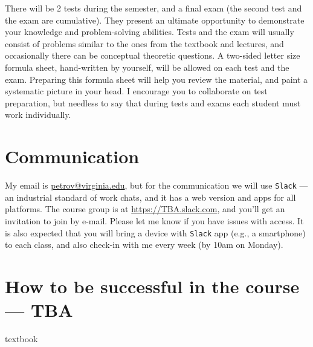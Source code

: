 \documentclass[oneside,11pt]{amsart}
\begin{document}
There will be 2 tests during the semester, and a final exam (the second test and the exam are cumulative). 
They present an ultimate opportunity to demonstrate your knowledge and
problem-solving abilities. Tests and the exam will usually consist of problems similar to the 
ones from the textbook and lectures, and occasionally 
there can be conceptual theoretic questions.
A two-sided letter size 
formula sheet, hand-written by yourself, will be allowed on each test and the exam. 
Preparing this formula sheet will help you review the material,
and paint a systematic picture in your head.
I encourage you to collaborate on test preparation,
but needless to say that during tests and exams each student must work individually.


\section{Communication}
\label{comm}
My email is \href{mailto:petrov@virginia.edu}{petrov@virginia.edu}, 
but for the communication we will use \texttt{Slack} --- an industrial standard of work chats,
and it has a web version and apps for all platforms.
The course group is at \url{https://TBA.slack.com}, 
and you'll get an invitation to join by e-mail. 
Please let me know if you have issues with access.
It is also expected that you will bring a device with \texttt{Slack} app
(e.g., a smartphone)
to each class, 
and also check-in with me every week (by 10am on Monday).






\section{How to be successful in the course 
--- TBA}

textbook



\end{document}
